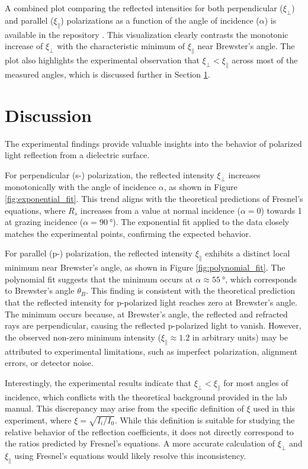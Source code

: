 \documentclass[journal]{IEEEtran}
\begin{document}
A combined plot comparing the reflected intensities for both perpendicular ($\xi_{\perp}$) and parallel ($\xi_{\parallel}$) polarizations as a function of the angle of incidence ($\alpha$) is available in the repository \cite{github}. This visualization clearly contrasts the monotonic increase of $\xi_{\perp}$ with the characteristic minimum of $\xi_{\parallel}$ near Brewster's angle. The plot also highlights the experimental observation that $\xi_{\perp} < \xi_{\parallel}$ across most of the measured angles, which is discussed further in Section \ref{sec:discussion}.

\section{Discussion}
\label{sec:discussion}
The experimental findings provide valuable insights into the behavior of polarized light reflection from a dielectric surface. 

For perpendicular (s-) polarization, the reflected intensity $\xi_{\perp}$ increases monotonically with the angle of incidence $\alpha$, as shown in Figure \ref{fig:exponential_fit}. This trend aligns with the theoretical predictions of Fresnel's equations, where $R_s$ increases from a value at normal incidence ($\alpha=0$) towards 1 at grazing incidence ($\alpha=\SI{90}{\degree}$). The exponential fit applied to the data closely matches the experimental points, confirming the expected behavior.

For parallel (p-) polarization, the reflected intensity $\xi_{\parallel}$ exhibits a distinct local minimum near Brewster's angle, as shown in Figure \ref{fig:polynomial_fit}. The polynomial fit suggests that the minimum occurs at $\alpha \approx \SI{55}{\degree}$, which corresponds to Brewster's angle $\theta_B$. This finding is consistent with the theoretical prediction that the reflected intensity for p-polarized light reaches zero at Brewster's angle. The minimum occurs because, at Brewster's angle, the reflected and refracted rays are perpendicular, causing the reflected p-polarized light to vanish. However, the observed non-zero minimum intensity ($\xi_{\parallel} \approx 1.2$ in arbitrary units) may be attributed to experimental limitations, such as imperfect polarization, alignment errors, or detector noise.

Interestingly, the experimental results indicate that $\xi_{\perp} < \xi_{\parallel}$ for most angles of incidence, which conflicts with the theoretical background provided in the lab manual. This discrepancy may arise from the specific definition of $\xi$ used in this experiment, where $\xi = \sqrt{I_i / I_0}$. While this definition is suitable for studying the relative behavior of the reflection coefficients, it does not directly correspond to the ratios predicted by Fresnel's equations. A more accurate calculation of $\xi_{\perp}$ and $\xi_{\parallel}$ using Fresnel's equations would likely resolve this inconsistency.
\end{document}
